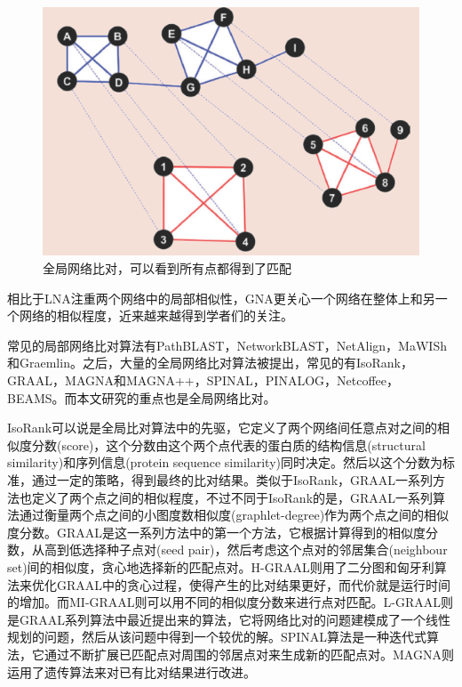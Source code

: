 \begin{figure}[htbp]
\centering
\includegraphics[height=0.25\textheight]{pic/gna.png}
\captionsetup{margin=50pt}
\caption{全局网络比对，可以看到所有点都得到了匹配 \cite{atias2012comparative} \label{fig:gna}}
\end{figure}
相比于LNA注重两个网络中的局部相似性，GNA更关心一个网络在整体上和另一个网络的相似程度，近来越来越得到学者们的关注。

常见的局部网络比对算法有PathBLAST\cite{kelley2004pathblast}，NetworkBLAST\cite{sharan2005conserved}，NetAlign\cite{liang2006netalign}，MaWISh\cite{koyuturk2006pairwise}和Graemlin\cite{flannick2006graemlin}。之后，大量的全局网络比对算法被提出，常见的有IsoRank\cite{singh2008global,liao2009isorankn}，GRAAL\cite{kuchaiev2011integrative,malod2015graal,kuchaiev2010topological,milenkovic2010optimal,memivsevic2012c}，MAGNA和MAGNA++\cite{saraph2014magna,vijayan2015magna++}，SPINAL\cite{aladaug2013spinal}，PINALOG\cite{phan2012pinalog}，Netcoffee\cite{hu2013netcoffee}，BEAMS\cite{alkan2014beams}。而本文研究的重点也是全局网络比对。

IsoRank\cite{singh2008global}可以说是全局比对算法中的先驱，它定义了两个网络间任意点对之间的相似度分数(score)，这个分数由这个两个点代表的蛋白质的结构信息(structural similarity)和序列信息(protein sequence similarity)同时决定。然后以这个分数为标准，通过一定的策略，得到最终的比对结果。类似于IsoRank，GRAAL一系列方法也定义了两个点之间的相似程度，不过不同于IsoRank的是，GRAAL一系列算法通过衡量两个点之间的小图度数相似度(graphlet-degree)作为两个点之间的相似度分数。GRAAL\cite{kuchaiev2010topological}是这一系列方法中的第一个方法，它根据计算得到的相似度分数，从高到低选择种子点对(seed pair)，然后考虑这个点对的邻居集合(neighbour set)间的相似度，贪心地选择新的匹配点对。H-GRAAL\cite{milenkovic2010optimal}则用了二分图和匈牙利算法来优化GRAAL中的贪心过程，使得产生的比对结果更好，而代价就是运行时间的增加。而MI-GRAAL\cite{kuchaiev2011integrative}则可以用不同的相似度分数来进行点对匹配。L-GRAAL\cite{malod2015graal}则是GRAAL系列算法中最近提出来的算法，它将网络比对的问题建模成了一个线性规划的问题，然后从该问题中得到一个较优的解。SPINAL算法\cite{aladaug2013spinal}是一种迭代式算法，它通过不断扩展已匹配点对周围的邻居点对来生成新的匹配点对。MAGNA\cite{saraph2014magna}则运用了遗传算法来对已有比对结果进行改进。

